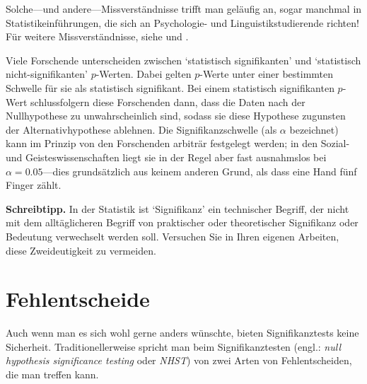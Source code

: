 \documentclass[oneside, 10pt]{book}\usepackage[]{graphicx}\usepackage[]{xcolor}
\begin{document}
Solche---und andere---Missverständnisse trifft man geläufig an, sogar manchmal
in Statistikeinführungen, die sich an Psychologie- und Linguistikstudierende richten!
Für weitere Missverständnisse, siehe \citet{Goodman2008} und \citet{Greenland2016}.

\bigskip

Viele Forschende unterscheiden zwischen `statistisch signifikanten' und
`statistisch nicht-sig\-ni\-fi\-kan\-ten' $p$-Werten. Dabei gelten $p$-Werte
unter einer bestimmten Schwelle für sie als statistisch signifikant.
Bei einem statistisch signifikanten $p$-Wert schlussfolgern diese
Forschenden dann, dass die Daten nach der Nullhypothese zu unwahrscheinlich
sind, sodass sie diese Hypothese zugunsten der Alternativhypothese
ablehnen. Die Signifikanzschwelle (als $\alpha$ bezeichnet)
kann im Prinzip von den Forschenden
arbiträr festgelegt werden; in den Sozial- und Geisteswissenschaften
liegt sie in der Regel aber fast ausnahmslos bei $\alpha = 0.05$---dies
grundsätzlich aus keinem anderen Grund, als dass eine Hand fünf Finger
zählt.

\bigskip

\begin{framed}
\textbf{Schreibtipp.} In der Statistik ist `Signifikanz' ein technischer Begriff,
der nicht mit dem alltäglicheren Begriff von praktischer oder theoretischer Signifikanz oder Bedeutung verwechselt werden soll. Versuchen Sie in Ihren eigenen Arbeiten, diese Zweideutigkeit zu vermeiden.
\end{framed}

\section{Fehlentscheide}
Auch wenn man es sich wohl gerne anders wünschte, bieten
Signifikanztests keine Sicherheit. Traditionellerweise
spricht man beim Signifikanztesten (engl.: \textit{null hypothesis
significance testing} oder \textit{NHST}) von zwei Arten
von Fehlentscheiden, die man treffen kann.
\end{document}
